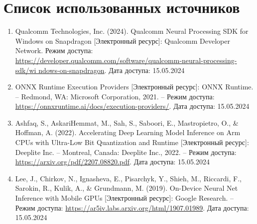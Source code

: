\documentclass[a4paper,14pt]{extreport}
\begin{document}
    \chapter*{Список использованных источников}
    \begin{enumerate}
        \item Qualcomm Technologies, Inc. (2024). Qualcomm Neural Processing SDK for Windows on Snapdragon [Электронный ресурс]: Qualcomm Developer Network. Режим доступа: \href{https://developer.qualcomm.com/software/qualcomm-neural-processing-sdk/wi ndows-on-snapdragon}{https://developer.qualcomm.com/software/qualcomm-neural-processing-sdk/wi ndows-on-snapdragon}. Дата доступа: 15.05.2024
        \item ONNX Runtime Execution Providers [Электронный ресурс]: ONNX Runtime. – Redmond, WA: Microsoft Corporation, 2021. – Режим доступа: \href{https://onnxruntime.ai/docs/execution-providers/}{https://onnxruntime.ai/docs/execution-providers/}. Дата доступа: 15.05.2024
        \item Ashfaq, S., AskariHemmat, M., Sah, S., Saboori, E., Mastropietro, O., \& Hoffman, A. (2022). Accelerating Deep Learning Model Inference on Arm CPUs with Ultra-Low Bit Quantization and Runtime [Электронный ресурс]: Deeplite Inc. – Montreal, Canada: Deeplite Inc., 2022. – Режим доступа: \href{https://arxiv.org/pdf/2207.08820.pdf}{https://arxiv.org/pdf/2207.08820.pdf}. Дата доступа: 15.05.2024
        \item Lee, J., Chirkov, N., Ignasheva, E., Pisarchyk, Y., Shieh, M., Riccardi, F., Sarokin, R., Kulik, A., \& Grundmann, M. (2019). On-Device Neural Net Inference with Mobile GPUs [Электронный ресурс]: Google Research. – Режим доступа: \href{https://ar5iv.labs.arxiv.org/html/1907.01989}{https://ar5iv.labs.arxiv.org/html/1907.01989}. Дата доступа: 15.05.2024

    \end{enumerate}
    
\end{document}
